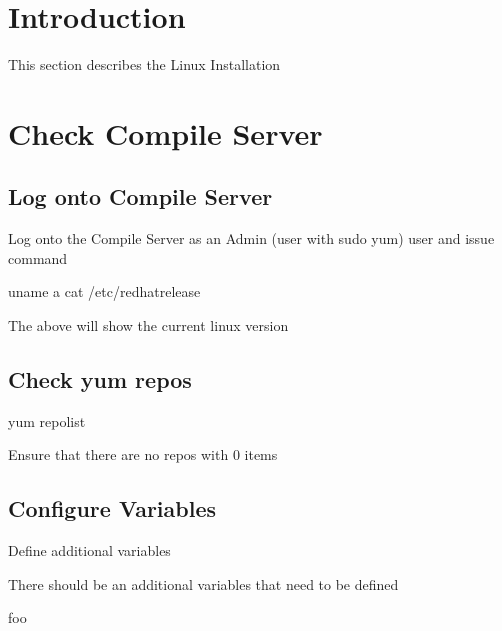 \documentclass[letterpaper,10pt,english]{sphinxmanual}
\begin{document}
\section{Introduction}
\label{\detokenize{legacy/legacy-install:introduction}}
\sphinxAtStartPar
This section describes the Linux Installation


\section{Check Compile Server}
\label{\detokenize{legacy/legacy-install:check-compile-server}}

\subsection{Log onto Compile Server}
\label{\detokenize{legacy/legacy-install:log-onto-compile-server}}
\sphinxAtStartPar
Log onto the Compile Server as an Admin (user with sudo yum) user and issue command

\begin{sphinxVerbatim}[commandchars=\\\{\}]
uname \PYGZhy{}a
cat /etc/redhat\PYGZhy{}release
\end{sphinxVerbatim}

\sphinxAtStartPar
The above will show the current linux version


\subsection{Check yum repos}
\label{\detokenize{legacy/legacy-install:check-yum-repos}}
\begin{sphinxVerbatim}[commandchars=\\\{\}]
yum repolist
\end{sphinxVerbatim}

\sphinxAtStartPar
Ensure that there are no repos with 0 items


\subsection{Configure Variables}
\label{\detokenize{legacy/legacy-install:configure-variables}}
\sphinxAtStartPar
Define additional variables

\sphinxAtStartPar
There should be an additional variables that need to be defined

\begin{sphinxVerbatim}[commandchars=\\\{\}]
 foo
\end{sphinxVerbatim}
\end{document}
